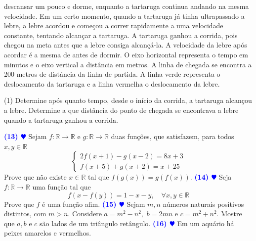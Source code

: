 \documentclass[12pt, a4paper]{article}
\newcommand{\negrito}[1]{\mbox{\boldmath{$#1$}}}
\begin{document}
descansar um pouco e dorme, enquanto a tartaruga continua andando na mesma velocidade. Em um certo momento, quando a tartaruga já tinha ultrapassado a lebre, a lebre acordou e começou a correr rapidamente a uma velocidade constante, tentando alcançar a tartaruga. A tartaruga ganhou a corrida, pois chegou na meta antes que a lebre consiga alcançá-la. A velocidade da lebre após acordar é a mesma de antes de
dormir. O eixo horizontal representa o tempo em minutos e o eixo vertical a distância
em metros. A linha de chegada se encontra a 200 metros de distância da linha de
partida. A linha verde representa o deslocamento da tartaruga e a linha vermelha o
deslocamento da lebre.
\begin{tasks}[counter-format={(tsk[a])},label-width=3.6ex, label-format = {\bfseries}, column-sep = {0pt}](1)
\task[\textcolor{Floresta}{$\negrito{(a)} $}] Determine após quanto tempo, desde o início da corrida, a tartaruga alcançou
a lebre.
\task[\textcolor{Floresta}{$\negrito{(b)} $}] Determine a que distância do ponto de chegada se encontrava a lebre quando
a tartaruga ganhou a corrida.
\end{tasks}
\textcolor{blue}{\bf(13) $\varheart$} Sejam $f \colon \mathbb{R} \to \mathbb{R}$ e $g \colon \mathbb{R} \to \mathbb{R}$ duas funções, que satisfazem, para todos $x, y \in \mathbb{R}$
\[
\begin{cases}2f(x+1)-g(x-2)=8x+3 \\f(x+5)+g(x+2)=x+25 \end{cases}
\]
Prove que não existe $x \in \mathbb{R}$ tal que $f(g(x)) = g(f(x)).$
\newline
\newline
\textcolor{blue}{\bf(14) $\varheart$} Seja $f \colon \mathbb{R} \to \mathbb{R}$ uma função tal que
\[
f(x - f(y)) = 1 - x - y, \quad \forall x,y \in \mathbb{R}
\]
Prove que $f$ é uma função afim.
\newline
\newline
\textcolor{blue}{\bf(15) $\varheart$} Sejam $m,n $ números naturais positivos distintos, com $m > n.$ Considere $a = m^2 - n^2,$ $b = 2mn$ e $c = m^2 + n^2.$ Mostre que $a,b$ e $c$ são lados de um triângulo retângulo.
\newline
\newline
\textcolor{blue}{\bf(16) $\varheart$} Em um aquário há peixes amarelos e vermelhos.
\end{document}
